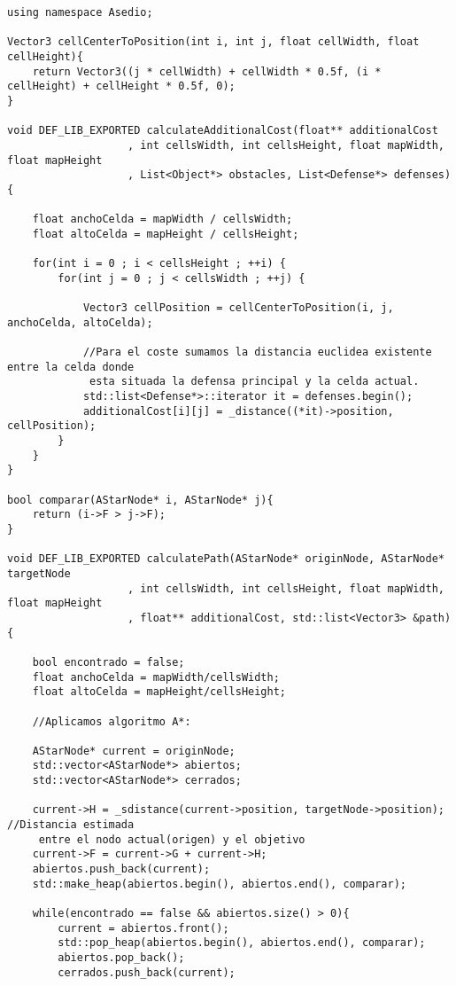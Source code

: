 \begin{verbatim}
using namespace Asedio;

Vector3 cellCenterToPosition(int i, int j, float cellWidth, float cellHeight){ 
    return Vector3((j * cellWidth) + cellWidth * 0.5f, (i * cellHeight) + cellHeight * 0.5f, 0); 
}

void DEF_LIB_EXPORTED calculateAdditionalCost(float** additionalCost
                   , int cellsWidth, int cellsHeight, float mapWidth, float mapHeight
                   , List<Object*> obstacles, List<Defense*> defenses) {

    float anchoCelda = mapWidth / cellsWidth;
    float altoCelda = mapHeight / cellsHeight;

    for(int i = 0 ; i < cellsHeight ; ++i) {
        for(int j = 0 ; j < cellsWidth ; ++j) {

            Vector3 cellPosition = cellCenterToPosition(i, j, anchoCelda, altoCelda);
            
            //Para el coste sumamos la distancia euclidea existente entre la celda donde
             esta situada la defensa principal y la celda actual.
            std::list<Defense*>::iterator it = defenses.begin();
            additionalCost[i][j] = _distance((*it)->position, cellPosition);
        }
    }  
}  

bool comparar(AStarNode* i, AStarNode* j){
	return (i->F > j->F);
}

void DEF_LIB_EXPORTED calculatePath(AStarNode* originNode, AStarNode* targetNode
                   , int cellsWidth, int cellsHeight, float mapWidth, float mapHeight
                   , float** additionalCost, std::list<Vector3> &path) {

    bool encontrado = false;
    float anchoCelda = mapWidth/cellsWidth;
    float altoCelda = mapHeight/cellsHeight;

    //Aplicamos algoritmo A*:
 
    AStarNode* current = originNode;
    std::vector<AStarNode*> abiertos;   
    std::vector<AStarNode*> cerrados;

    current->H = _sdistance(current->position, targetNode->position);   //Distancia estimada
     entre el nodo actual(origen) y el objetivo
    current->F = current->G + current->H;
    abiertos.push_back(current);
    std::make_heap(abiertos.begin(), abiertos.end(), comparar);

    while(encontrado == false && abiertos.size() > 0){
    	current = abiertos.front();
    	std::pop_heap(abiertos.begin(), abiertos.end(), comparar);
    	abiertos.pop_back();
    	cerrados.push_back(current);


\end{verbatim}

